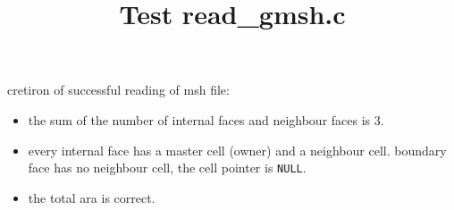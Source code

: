 \documentclass[a4paper]{article}
\begin{document}
\title{Test read\_gmsh.c}
\maketitle 

cretiron of successful reading of msh file:
\begin{itemize}
\item the sum of the number of internal faces and neighbour faces is 3.
\item every internal face has a master cell (owner) and a neighbour cell. boundary face has no neighbour cell, the cell pointer is \verb|NULL|.
\item the total ara is correct.
\end{itemize}

 
\end{document}
